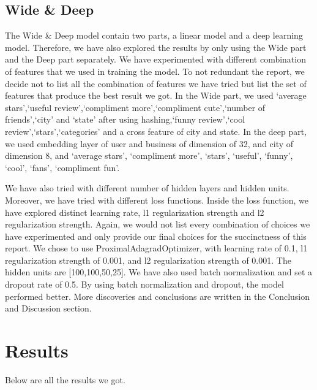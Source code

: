 \documentclass[journal]{IEEEtran}
\begin{document}
\subsection{Wide \& Deep}
The Wide \& Deep model contain two parts, a linear model and a deep learning model. Therefore, we have also explored the results by only using the Wide part and the Deep part separately. We have experimented with different combination of features that we used in training the model. To not redundant the report, we decide not to list all the combination of features we have tried but list the set of features that produce the best result we got. In the Wide part, we used `average stars',`useful review',`compliment more',`compliment cute',`number of friends',`city' and `state' after using hashing,`funny review',`cool review',`stars',`categories' and a cross feature of city and state. In the deep part, we used embedding layer of user and business of dimension of 32, and city of dimension 8, and `average stars', `compliment more', `stars', `useful', `funny', `cool', `fans', `compliment fun'. 

We have also tried with different number of hidden layers and hidden units. Moreover, we have tried with different loss functions. Inside the loss function, we have explored distinct learning rate, l1 regularization strength and l2 regularization strength. Again, we would not list every combination of choices we have experimented and only provide our final choices for the succinctness of this report. We chose to use ProximalAdagradOptimizer, with learning rate of 0.1, l1 regularization strength of 0.001, and l2 regularization strength of 0.001. The hidden units are [100,100,50,25]. We have also used batch normalization and set a dropout rate of 0.5. By using batch normalization and dropout, the model performed better. More discoveries and conclusions are written in the Conclusion and Discussion section.



\section{Results}
Below are all the results we got.
\end{document}
